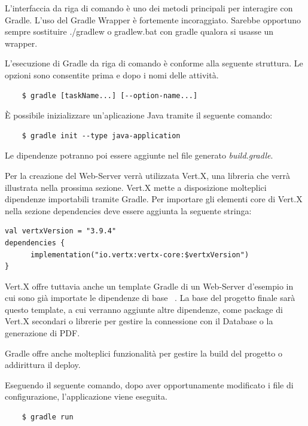 \noindent L'interfaccia da riga di comando è uno dei metodi principali per interagire con Gradle.
L'uso del Gradle Wrapper è fortemente incoraggiato. Sarebbe opportuno sempre sostituire ./gradlew o gradlew.bat con gradle qualora si usasse un wrapper.

\noindent L'esecuzione di Gradle da riga di comando è conforme alla seguente struttura. Le opzioni sono consentite prima e dopo i nomi delle attività.

\begin{verbatim}
    $ gradle [taskName...] [--option-name...]
\end{verbatim}

\noindent È possibile inizializzare un'aplicazione Java tramite il seguente comando:
\begin{verbatim}
    $ gradle init --type java-application
\end{verbatim}

\noindent Le dipendenze potranno poi essere aggiunte nel file generato \textit{build.gradle}.\newline

Per la creazione del Web-Server verrà utilizzata  Vert.X, una libreria che verrà illustrata nella prossima sezione.\newline
Vert.X mette a disposizione molteplici dipendenze importabili tramite Gradle.
Per importare gli elementi core di Vert.X nella sezione dependencies deve essere aggiunta la seguente stringa:
\begin{verbatim}
val vertxVersion = "3.9.4"
dependencies {
      implementation("io.vertx:vertx-core:$vertxVersion")
}
\end{verbatim}

\noindent Vert.X offre tuttavia anche un template Gradle di un Web-Server d'esempio in cui sono già importate le dipendenze di base ~\cite{vertx3ve91:online}.
La base del progetto finale sarà questo template, a cui verranno aggiunte altre dipendenze, come package di Vert.X secondari o librerie per gestire la connessione con il Database o la generazione di PDF.

\noindent Gradle offre anche molteplici funzionalità per gestire la build del progetto o addirittura il deploy.

\noindent Eseguendo il seguente comando, dopo aver opportunamente modificato i file di configurazione, l'applicazione viene eseguita.
\begin{verbatim}
    $ gradle run
\end{verbatim}

